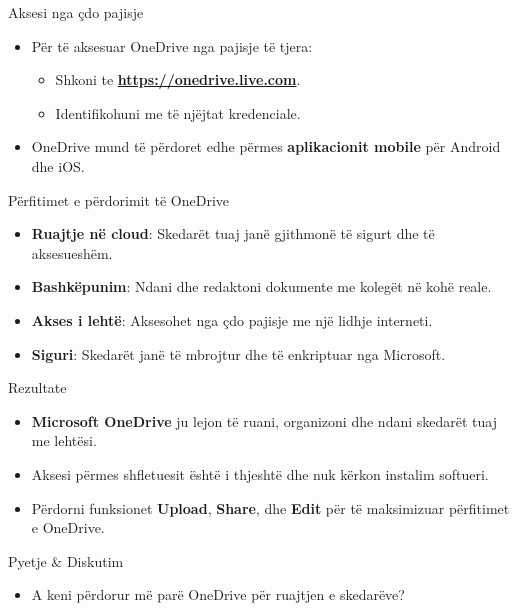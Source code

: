 \documentclass[
  ignorenonframetext,
]{beamer}
\providecommand{\tightlist}{%
  \setlength{\itemsep}{0pt}\setlength{\parskip}{0pt}}
\begin{document}
\begin{frame}{Aksesi nga çdo pajisje}
\label{aksesi-nga-uxe7do-pajisje}
\begin{itemize}
\item
  Për të aksesuar OneDrive nga pajisje të tjera:

  \begin{itemize}
  \item
    Shkoni te \textbf{\url{https://onedrive.live.com}}.
  \item
    Identifikohuni me të njëjtat kredenciale.
  \end{itemize}
\item
  OneDrive mund të përdoret edhe përmes \textbf{aplikacionit mobile} për
  Android dhe iOS.
\end{itemize}
\end{frame}

\begin{frame}{Përfitimet e përdorimit të OneDrive}
\label{puxebrfitimet-e-puxebrdorimit-tuxeb-onedrive}
\begin{itemize}
\item
  \textbf{Ruajtje në cloud}: Skedarët tuaj janë gjithmonë të sigurt dhe
  të aksesueshëm.
\item
  \textbf{Bashkëpunim}: Ndani dhe redaktoni dokumente me kolegët në kohë
  reale.
\item
  \textbf{Akses i lehtë}: Aksesohet nga çdo pajisje me një lidhje
  interneti.
\item
  \textbf{Siguri}: Skedarët janë të mbrojtur dhe të enkriptuar nga
  Microsoft.
\end{itemize}
\end{frame}

\begin{frame}{Rezultate}
\label{rezultate-7}
\begin{itemize}
\item
  \textbf{Microsoft OneDrive} ju lejon të ruani, organizoni dhe ndani
  skedarët tuaj me lehtësi.
\item
  Aksesi përmes shfletuesit është i thjeshtë dhe nuk kërkon instalim
  softueri.
\item
  Përdorni funksionet \textbf{Upload}, \textbf{Share}, dhe \textbf{Edit}
  për të maksimizuar përfitimet e OneDrive.
\end{itemize}
\end{frame}

\begin{frame}{Pyetje \& Diskutim}
\label{pyetje-diskutim-10}
\begin{itemize}
\tightlist
\item
  A keni përdorur më parë OneDrive për ruajtjen e skedarëve?
\end{itemize}
\end{frame}
\end{document}
